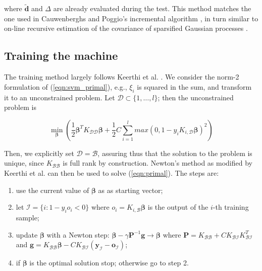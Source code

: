 \documentclass[10pt,twocolumn,letterpaper]{article}
\def\bb{\mathbf{\beta}}
\def\dd{\mathbf{d}}
\def\mdd{\tilde{\dd}}
\def\b{\mathcal{B}}
\def\d{\mathcal{D}}
\begin{document}
where $\mdd$ and $\Delta$ are already evaluated during the test. This
method matches the one used in Cauwenberghs and Poggio's incremental
algorithm \cite{CauwenberghsP00}, in turn similar to on-line recursive
estimation of the covariance of sparsified Gaussian processes
\cite{csat'o01sparse}.

\subsection{Training the machine}

The training method largely follows Keerthi et
al. \cite{KeerthiDC05,KeerthiCDC06}. We consider the norm-2
formulation of (\ref{eqn:svm_primal}), e.g., $\xi_i$ is squared in the
sum, and transform it to an unconstrained problem. Let $\d \subset
\{1,\ldots,l\}$; then the unconstrained problem is

\begin{equation} \label{eqn:primal}
  \min_{\bb} \left( 
      \frac{1}{2} \bb^T K_{\d\d} \bb
    + \frac{1}{2} C \sum_{i=1}^l max \left(0,1-y_i K_{i,\d} \bb \right)^2
  \right)
\end{equation}

Then, we explicitly set $\d = \b$, assuring thus that the solution to
the problem is unique, since $K_{\b\b}$ is full rank by
construction. Newton's method as modified by Keerthi et
al. \cite{KeerthiDC05,KeerthiCDC06} can then be used to solve
(\ref{eqn:primal}). The steps are:

\begin{enumerate}

   \item use the current value of $\boldsymbol{\beta}$ as as starting
     vector;

   \item let $\mathcal{I} = \{ i: 1-y_i o_i<0 \}$ where $o_i =
     K_{i,\b} \bb$ is the output of the $i$-th training sample;

   \item update $\bb$ with a Newton step:
     $\bb - \gamma \mathbf{P}^{-1}\mathbf{g} \rightarrow \bb$ where
     $\mathbf{P} = K_{\b\b} + C K_{\b\mathcal{I}} K_{\b\mathcal{I}}^T$ and
     $\mathbf{g} = K_{\b\b} \bb - C K_{\b\mathcal{I}}
        \left( \mathbf{y}_{\mathcal{I}}-\mathbf{o}_{\mathcal{I}}\right)$;

   \item if $\bb$ is the optimal solution stop; otherwise go to step
     2.

\end{enumerate}
\end{document}

